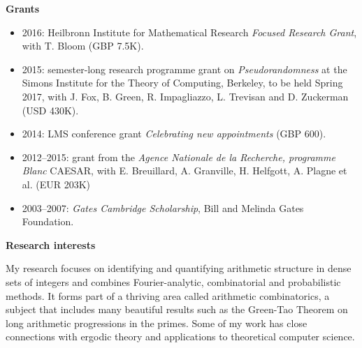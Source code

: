 \documentclass[11pt]{article}
\newenvironment{mitemize}{
\begin{itemize}
  \setlength{\itemsep}{1pt}
  \setlength{\parskip}{0pt}
  \setlength{\parsep}{0pt}
}{\end{itemize}}
\begin{document}
\vspace{2pt}
\textbf{Grants}
\begin{mitemize}
\item 2016: Heilbronn Institute for Mathematical Research \textit{Focused Research Grant}, with T. Bloom (GBP 7.5K).
\item 2015: semester-long research programme grant on \emph{Pseudorandomness} at the Simons Institute for the Theory of Computing, Berkeley, to be held Spring 2017, with J. Fox, B. Green, R. Impagliazzo, L. Trevisan and D. Zuckerman (USD 430K).
\item 2014: LMS conference grant \textit{Celebrating new appointments} (GBP 600).
\item 2012--2015: grant from the \textit{Agence Nationale de la Recherche, programme Blanc} CAESAR, with E. Breuillard, A. Granville, H. Helfgott, A. Plagne et al. (EUR 203K)
\item 2003--2007: \textit{Gates Cambridge Scholarship}, Bill and Melinda Gates Foundation.
\end{mitemize}

\vspace{3pt}
\textbf{Research interests}
\vspace{7pt}

My research focuses on identifying and quantifying arithmetic structure in dense sets of integers and combines Fourier-analytic, combinatorial and probabilistic methods. It forms part of a thriving area called arithmetic combinatorics, a subject that includes many beautiful results such as the Green-Tao Theorem on long arithmetic progressions in the primes. Some of my work has close connections with ergodic theory and applications to theoretical computer science.


%
\end{document}
